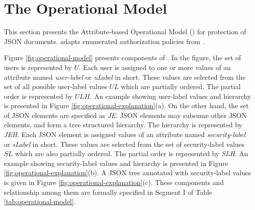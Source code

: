 

\section{The Operational Model}





\label{sec:operational-model}


This section presents the Attribute-based Operational Model (\atom{}) for protection of JSON documents. \atom{} adapts enumerated authorization policies from  \cite{labac,eap-abac}.





Figure \ref{fig:operational-model} presents components of \atom{}. In the figure, the set of users is represented by $U$. Each user is assigned to one or more values of an attribute named \textit{user-label} or \textit{uLabel} in short. These values are selected from the set of all possible user-label values $UL$ which are partially ordered. The partial order is represented by $ULH$. An example showing user-label values and  hierarchy is presented in Figure \ref{fig:operational-explanation}(a). On the other hand, the set of JSON elements are specified as \textit{JE}. JSON elements may subsume other JSON elements, and form a tree structured hierarchy. The hierarchy is represented by \textit{JEH}. Each JSON element is assigned values of an attribute named \textit{security-label} or \textit{sLabel} in short. These values are selected from the set of security-label values $SL$ which are also partially ordered. The partial order is represented by \textit{SLH}. An example showing security-label values and  hierarchy is presented in Figure \ref{fig:operational-explanation}(b). A JSON tree annotated with security-label values is given in Figure \ref{fig:operational-explanation}(c). These components and relationship among them are formally specified in Segment I of Table  \ref{tab:operational-model}.


